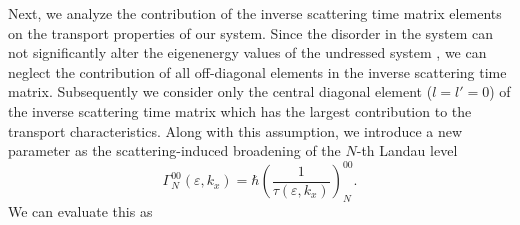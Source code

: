Next, we analyze the contribution of the inverse scattering time matrix elements on the transport properties of our system.
Since the disorder in the system can not significantly alter the eigenenergy values of the undressed system \cite{wackerl20}, we can neglect the contribution of all off-diagonal elements in the inverse scattering time matrix. Subsequently we consider only the central diagonal element (${l=l'=0}$) of the inverse scattering time matrix which has the largest contribution to the transport characteristics. Along with this assumption, we introduce a new parameter as the scattering-induced broadening of the $N$-th Landau level \cite{dini16,endo09}
\begin{equation} \label{eq:16}
 \Gamma^{00}_{N}(\varepsilon,k_x) =
 \hbar \left(\frac{1}{\tau(\varepsilon,k_x)}\right)^{00}_N.
\end{equation}
We can evaluate this as
